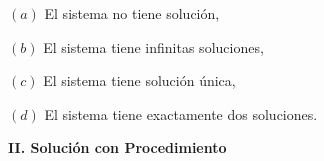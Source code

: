 \documentclass[11pt]{article}
\begin{document}
\begin{enumerate}
\vspace{6pt}
\noindent
\begin{minipage}[t]{0.5\linewidth}
$(a)$ El sistema no tiene solución,
\end{minipage}%
\begin{minipage}[t]{0.46\linewidth}
$(b)$ El sistema tiene infinitas soluciones,
\end{minipage}

\vspace{4pt}
\noindent
\begin{minipage}[t]{0.5\linewidth}
$(c)$ El sistema tiene solución única,
\end{minipage}%
\begin{minipage}[t]{0.46\linewidth}
$(d)$ El sistema tiene exactamente dos soluciones.
\end{minipage}
\end{enumerate}

\vspace{6pt}
\begin{center}\textbf{II. Solución con Procedimiento}\end{center}
\end{document}
